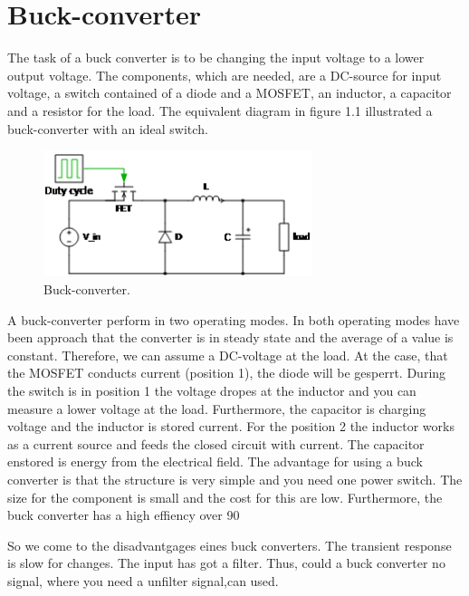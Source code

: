 \section{Buck-converter\label{B-C}}

The task of a buck converter is to be changing the input voltage to a lower output voltage. The components, which are needed, are a DC-source for input voltage, a switch contained of a diode and a MOSFET, an inductor, a capacitor and a resistor for the load. The equivalent diagram in figure 1.1 illustrated a buck-converter with an ideal switch.  

\begin{figure}[htbp]
	\begin{center}
		\includegraphics[width=0.7\textwidth]{../Pictures/Buck-converter}
		\caption{Buck-converter.}
		\label{Buck-converter}
	\end{center}	
\end{figure}

A buck-converter perform in two operating modes. In both operating modes have been approach that the converter is in steady state and the average of a value is constant. Therefore, we can assume a DC-voltage at the load. At the case, that the MOSFET conducts current (position 1), the diode will be gesperrt. During the switch is in position 1 the voltage dropes at the inductor and you can measure a lower voltage at the load. Furthermore, the capacitor is charging voltage and the inductor is stored current. For the position 2 the inductor works as a current source and feeds the closed circuit with current. The capacitor enstored is energy from the electrical field.
The advantage for using a buck converter is that the structure is very simple and you need one power switch. The size for the component is small and the cost for this are low. Furthermore, the buck converter has a high effiency over 90 %

So we come to the disadvantgages eines buck converters. The transient response is slow for changes. The input has got a filter. Thus, could a buck converter no signal, where you need a unfilter signal,can used.
